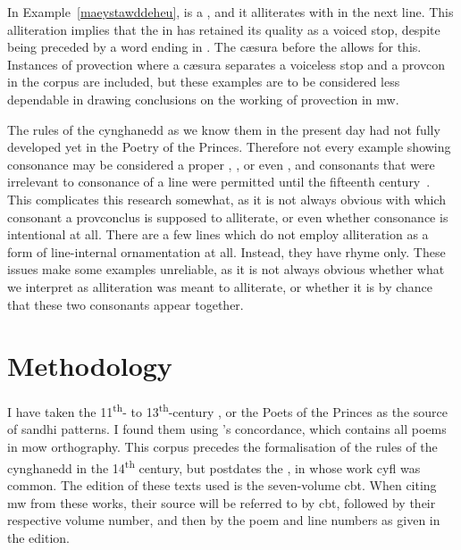 In Example~\ref{maeystawddeheu},  is a , and it alliterates with  in the next line. This alliteration implies that the  in  has retained its quality as a voiced stop, despite being preceded by a word ending in . The cæsura before the  allows for this. Instances of provection where a cæsura separates a voiceless stop and a \gls{provcon} in the corpus are included, but these examples are to be considered less dependable in drawing conclusions on the working of provection in \gls{mw}.

The rules of the cynghanedd as we know them in the present day had not fully developed yet in the Poetry of the Princes. Therefore not every example showing consonance may be considered a proper , ,  or even , and consonants that were irrelevant to consonance of a line were permitted until the fifteenth century~\autocite[§§~332, 339]{morris-jones_cerdd_1925}. This complicates this research somewhat, as it is not always obvious with which consonant a \gls{provconclus} is supposed to alliterate, or even whether consonance is intentional at all. There are a few lines which do not employ alliteration as a form of line-internal ornamentation at all. Instead, they have rhyme only. These issues make some examples unreliable, as it is not always obvious whether what we interpret as alliteration was meant to alliterate, or whether it is by chance that these two consonants appear together.

\section{Methodology}
\label{sec:methodology}

I have taken the 11\textsuperscript{th}- to 13\textsuperscript{th}-century , or the Poets of the Princes as the source of sandhi patterns. I found them using \textcite{parry_owen_concordans_????}'s concordance, which contains all poems in \gls{mow} orthography. This corpus precedes the formalisation of the rules of the cynghanedd in the 14\textsuperscript{th} century, but postdates the , in whose work \gls{cyfl} was common. The edition of these texts used is the seven-volume \gls{cbt}. When citing \gls{mw} from these works, their source will be referred to by \acrshort{cbt}, followed by their respective volume number, and then by the poem and line numbers as given in the edition.  

